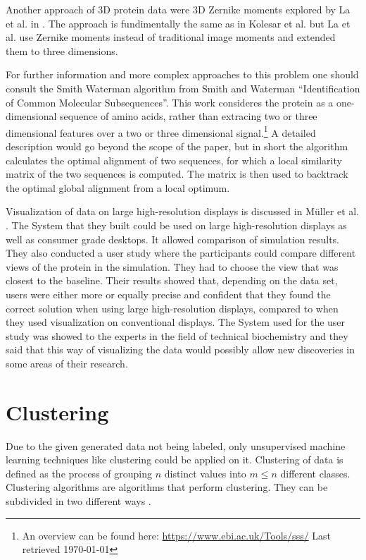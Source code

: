 \documentclass[journal]{vgtc}       %
\newcommand{\todo}[1]{\textcolor{red}{\textbf{TODO:} #1}}
\begin{document}
Another approach of  3D protein data were 3D Zernike moments explored by La et al. in \cite{3dsurfer}. The approach is fundimentally the same as in Kolesar et al. but La et al.  use  Zernike moments instead of traditional image moments and extended them to three dimensions.


For further information and more complex approaches to this problem one should consult the Smith Waterman algorithm from Smith and Waterman ``Identification of Common Molecular Subsequences''\cite{smithwater}. This work consideres the protein as a one-dimensional sequence of amino acids, rather than extracing two or three dimensional features over a two or three dimensional signal.\footnote{An overview can be found here:  \url{https://www.ebi.ac.uk/Tools/sss/} Last retrieved \today} A detailed description would go beyond the scope of the paper, but in short the algorithm calculates the optimal alignment of two sequences, for which a local similarity matrix of the two sequences is computed. The matrix is then used to backtrack the optimal global alignment from a local optimum. 

Visualization of data on large high-resolution displays is discussed in M{\"u}ller et al. \cite{powerwall}. The System that they built could be used on large high-resolution displays as well as consumer grade desktops. It allowed comparison of simulation results. They also conducted a user study where the participants could compare different views of the protein in the simulation. They had to choose the view that was closest to the baseline. Their results showed that, depending on the data set, users were either more or equally precise and confident that they found the correct solution when using large high-resolution displays, compared to when they used visualization on conventional displays. The System used for the user study was showed to the experts in the field of technical biochemistry and they said that this way of visualizing the data would possibly allow new discoveries in some areas of their research.
\section{Clustering}

Due to the given generated data  not being  labeled, only unsupervised machine learning techniques like clustering could be applied on it. 
Clustering of data is defined as the process of grouping $n$ distinct values into $m \leq n$ different classes. Clustering algorithms are algorithms that perform clustering. They can be subdivided in two different ways \cite{iir}.
\end{document}
